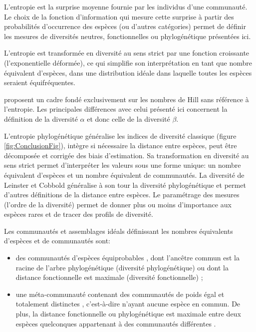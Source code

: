 \documentclass[
  11pt,
  french,
  a4paper,
  extrafontsizes,onecolumn,openright
  ]{memoir}
\providecommand{\tightlist}{%
  \setlength{\itemsep}{0pt}\setlength{\parskip}{0pt}}
\begin{document}
\normalsize

L'entropie est la surprise moyenne fournie par les individus d'une communauté.
Le choix de la fonction d'information qui mesure cette surprise à partir des probabilités d'occurrence des espèces (ou d'autres catégories) permet de définir les mesures de diversités neutres, fonctionnelles ou phylogénétique présentées ici.

L'entropie est transformée en diversité au sens strict par une fonction croissante (l'exponentielle déformée), ce qui simplifie son interprétation en tant que nombre équivalent d'espèces, dans une distribution idéale dans laquelle toutes les espèces seraient équifréquentes.

\textcite{Chao2014a} proposent un cadre fondé exclusivement sur les nombres de Hill sans référence à l'entropie.
Les principales différences avec celui présenté ici concernent la définition de la diversité \(\alpha\) et donc celle de la diversité \(\beta\).

L'entropie phylogénétique généralise les indices de diversité classique (figure \ref{fig:ConclusionFig}), intègre si nécessaire la distance entre espèces, peut être décomposée et corrigée des biais d'estimation.
Sa transformation en diversité au sens strict permet d'interpréter les valeurs sous une forme unique: un nombre équivalent d'espèces et un nombre équivalent de communautés.
La diversité de Leinster et Cobbold généralise à son tour la diversité phylogénétique et permet d'autres définitions de la distance entre espèces.
Le paramétrage des mesures (l'ordre de la diversité) permet de donner plus ou moins d'importance aux espèces rares et de tracer des profils de diversité.

Les communautés et assemblages idéals définissant les nombres équivalents d'espèces et de communautés sont:

\begin{itemize}
\tightlist
\item
  des communautés d'espèces équiprobables \autocite{Hill1973}, dont l'ancêtre commun est la racine de l'arbre phylogénétique (diversité phylogénétique)\autocite{Marcon2014b} ou dont la distance fonctionnelle est maximale (diversité fonctionnelle) \autocite{Leinster2012};
\item
  une méta-communauté contenant des communautés de poids égal et totalement distinctes \autocite{Jost2007}, c'est-à-dire n'ayant aucune espèce en commun. De plus, la distance fonctionnelle ou phylogénétique est maximale entre deux espèces quelconques appartenant à des communautés différentes \autocite{Pavoine2015a}.
\end{itemize}
\end{document}
